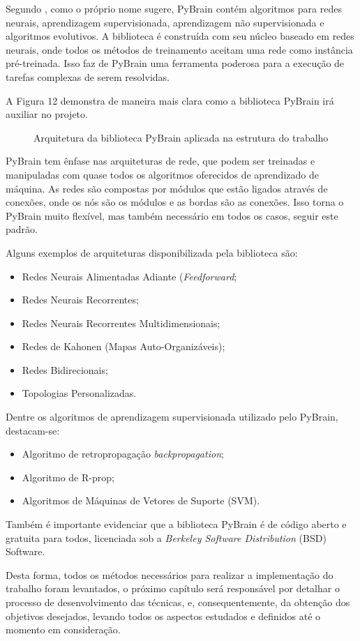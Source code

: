Segundo , como o próprio nome sugere, PyBrain contém algoritmos para redes neurais, aprendizagem supervisionada, aprendizagem não supervisionada e algoritmos evolutivos. A biblioteca é construída com seu núcleo baseado em redes neurais, onde todos os métodos de treinamento aceitam uma rede como instância pré-treinada. Isso faz de PyBrain uma ferramenta poderosa para a execução de tarefas complexas de serem resolvidas.

A Figura 12 demonstra de maneira mais clara como a biblioteca PyBrain irá auxiliar no projeto.

\begin{figure}[h]
	\centering
	\caption{Arquitetura da biblioteca PyBrain aplicada na estrutura do trabalho}
	\label{exec-rna-pybrain}
\end{figure}

PyBrain tem ênfase nas arquiteturas de rede, que podem ser treinadas e manipuladas com quase todos os algoritmos oferecidos de aprendizado de máquina. As redes são compostas por módulos que estão ligados através de conexões, onde os nós são os módulos e as bordas são as conexões. Isso torna o PyBrain muito flexível, mas também necessário em todos os casos, seguir este padrão.

Alguns exemplos de arquiteturas disponibilizada pela biblioteca são:

\begin{itemize}
	\item Redes Neurais Alimentadas Adiante (\textit{Feedforward};
	\item Redes Neurais Recorrentes;
	\item Redes Neurais Recorrentes Multidimensionais;
	\item Redes de Kahonen (Mapas Auto-Organizáveis);
	\item Redes Bidirecionais;
	\item Topologias Personalizadas.
\end{itemize}

Dentre os algoritmos de aprendizagem supervisionada utilizado pelo PyBrain, destacam-se:

\begin{itemize}
	\item Algoritmo de retropropagação \textit{backpropagation};
	\item Algoritmo de R-prop;
	\item Algoritmos de Máquinas de Vetores de Suporte (SVM).
\end{itemize}	

Também é importante evidenciar que a biblioteca PyBrain é de código aberto e gratuita para todos, licenciada sob a \textit{Berkeley Software Distribution} (BSD) Software.

Desta forma, todos os métodos necessários para realizar a implementação do trabalho foram levantados, o próximo capítulo será responsável por detalhar o processo de desenvolvimento das técnicas, e, consequentemente, da obtenção dos objetivos desejados, levando todos os aspectos estudados e definidos até o momento em consideração.